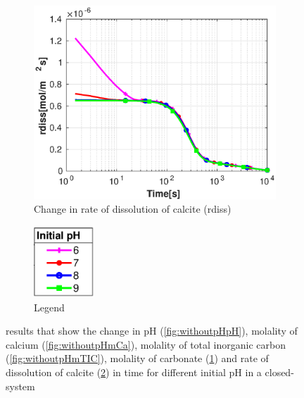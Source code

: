 \begin{figure}[!h]
\begin{subfigure}{.5\linewidth}
        \label{fig:withoutpHmCO3}
    \end{subfigure}%
    \hfill
    \begin{subfigure}{.5\linewidth}
            \centering
        \includegraphics[width=\textwidth]{PICTURES/without_pH_rdiss.eps}
        \caption{Change in rate of dissolution of calcite (rdiss)}
        \label{fig:withoutpHrdiss}
    \end{subfigure}%
  \hfill
  \begin{subfigure}{.5\linewidth}
            \centering
        \includegraphics[width=0.25\textwidth]{PICTURES/with_pH_legend.eps}
        \caption{Legend}
        \label{fig:withoutpHlegend}
    \end{subfigure}%
    \caption{\DuMuX results that show the change in pH (\cref{fig:withoutpHpH}), molality of calcium (\cref{fig:withoutpHmCa}), 
    molality of total inorganic carbon (\cref{fig:withoutpHmTIC}), molality of carbonate (\cref{fig:withoutpHmCO3}) 
    and rate of dissolution of calcite (\cref{fig:withoutpHrdiss}) in time for different initial pH in a closed-system}
    
    \label{fig:comparisionWithoutDiffInitialpH}
\end{figure}

